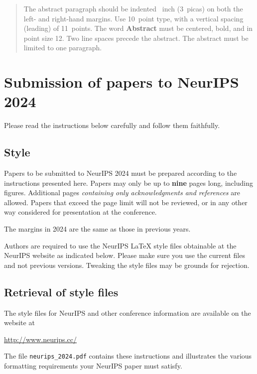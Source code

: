 \begin{abstract}
    The abstract paragraph should be indented ~inch (3~picas) on
    both the left- and right-hand margins. Use 10~point type, with a vertical
    spacing (leading) of 11~points.  The word \textbf{Abstract} must be centered,
    bold, and in point size 12. Two line spaces precede the abstract. The abstract
    must be limited to one paragraph.
  \end{abstract}
  
  
  \section{Submission of papers to NeurIPS 2024}
  
  
  Please read the instructions below carefully and follow them faithfully.
  
  
  \subsection{Style}
  
  
  Papers to be submitted to NeurIPS 2024 must be prepared according to the
  instructions presented here. Papers may only be up to {\bf nine} pages long,
  including figures. Additional pages \emph{containing only acknowledgments and
  references} are allowed. Papers that exceed the page limit will not be
  reviewed, or in any other way considered for presentation at the conference.
  
  
  The margins in 2024 are the same as those in previous years.
  
  
  Authors are required to use the NeurIPS \LaTeX{} style files obtainable at the
  NeurIPS website as indicated below. Please make sure you use the current files
  and not previous versions. Tweaking the style files may be grounds for
  rejection.
  
  
  \subsection{Retrieval of style files}
  
  
  The style files for NeurIPS and other conference information are available on
  the website at
  \begin{center}
    \url{http://www.neurips.cc/}
  \end{center}
  The file \verb+neurips_2024.pdf+ contains these instructions and illustrates the
  various formatting requirements your NeurIPS paper must satisfy.
  
